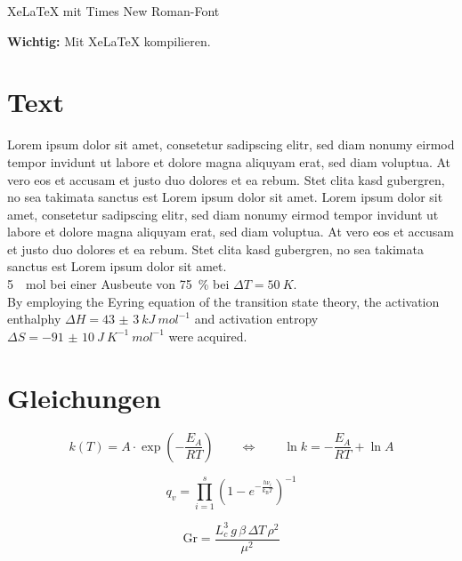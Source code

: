\documentclass[12pt,a4paper]{article}
\begin{document}
\begin{center}\Large
XeLaTeX mit Times New Roman-Font
\end{center}

\begin{center}
\textbf{Wichtig:} Mit XeLaTeX kompilieren.
\end{center}

\section{Text}\sloppy
Lorem ipsum dolor sit amet, consetetur sadipscing elitr, sed diam nonumy eirmod tempor invidunt ut labore et dolore magna aliquyam erat, sed diam voluptua. At vero eos et accusam et justo duo dolores et ea rebum. Stet clita kasd gubergren, no sea takimata sanctus est Lorem ipsum dolor sit amet. Lorem ipsum dolor sit amet, consetetur sadipscing elitr, sed diam nonumy eirmod tempor invidunt ut labore et dolore magna aliquyam erat, sed diam voluptua. At vero eos et accusam et justo duo dolores et ea rebum. Stet clita kasd gubergren, no sea takimata sanctus est Lorem ipsum dolor sit amet.\\

\SI{5}{\mu mol} bei einer Ausbeute von \SI{75}{\%} bei $\Delta T=\SI{50}{K}$. \\

By employing the Eyring equation of the transition state theory, the activation enthalphy $\Delta H=\SI{43(3)}{kJ\:mol^{-1}}$ and activation entropy $\Delta S=\SI{-91(10)}{J\:K^{-1}\:mol^{-1}}$ were acquired.


\section{Gleichungen}
\begin{equation}
k(T)=A\cdot\exp\left(-\frac{E_A}{RT}\right)\qquad\Leftrightarrow\qquad \ln k=-\frac{E_A}{RT}+\ln A
\end{equation}

\begin{equation}
q_v=\prod_{i=1}^s\left(1-e^{-\frac{h\nu_i}{k_\textrm{B}T}}\right)^{-1}
\end{equation}

\begin{equation}
\textrm{Gr}=\frac{L_c^3\,g\,\beta\,\Delta T\,\rho^2}{\mu^2}
\end{equation}
\end{document}
